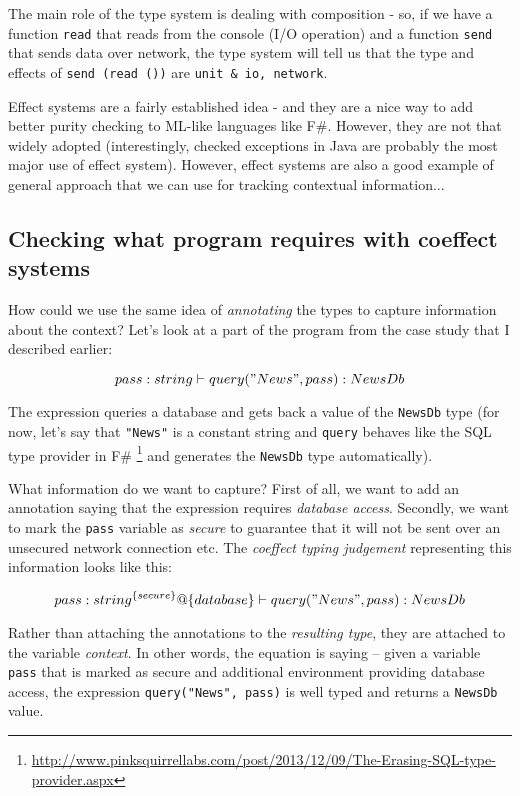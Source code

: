 The main role of the type system is dealing with composition - so, if we have a function \texttt{read} that
reads from the console (I/O operation) and a function \texttt{send} that sends data over network, the type
system will tell us that the type and effects of \texttt{send (read ())} are \texttt{unit \& {io, network}}.

Effect systems are a fairly established idea - and they are a nice way to add better purity checking
to ML-like languages like F\#. However, they are not that widely adopted (interestingly, checked
exceptions in Java are probably the most major use of effect system). However, effect systems are
also a good example of general approach that we can use for tracking contextual information...

\subsection{Checking what program requires with coeffect systems}

How could we use the same idea of \emph{annotating} the types to capture information about the context?
Let's look at a part of the program from the case study that I described earlier:

\begin{equation}
pass : string \vdash query("News", pass) : NewsDb
\end{equation}

The expression queries a database and gets back a value of the \texttt{NewsDb} type (for now, let's say
that \texttt{"News"} is a constant string and \texttt{query} behaves like the SQL type provider in F\# \footnote{\url{http://www.pinksquirrellabs.com/post/2013/12/09/The-Erasing-SQL-type-provider.aspx}}
and generates the \texttt{NewsDb} type automatically).

What information do we want to capture? First of all, we want to add an annotation saying that
the expression requires \emph{database access}. Secondly, we want to mark the \texttt{pass} variable as 
\emph{secure} to guarantee that it will not be sent over an unsecured network connection etc.
The \emph{coeffect typing judgement} representing this information looks like this:

\begin{equation}
pass : string^{\{secure\}} @ \{database\} \vdash query("News", pass) : NewsDb
\end{equation}

Rather than attaching the annotations to the \emph{resulting type}, they are attached to the 
variable \emph{context}. In other words, the equation is saying -- given a variable \texttt{pass} that is
marked as secure and additional environment providing database access, the expression
\texttt{query("News", pass)} is well typed and returns a \texttt{NewsDb} value.

